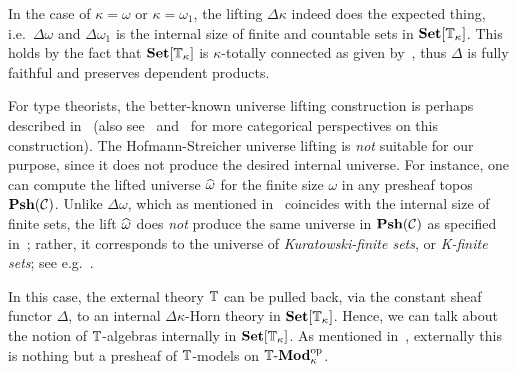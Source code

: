 \begin{remark}\label{rem:constantlifting}
  In the case of $\kappa = \omega$ or $\kappa = \omega_1$, the lifting $\Delta\kappa$ indeed does the expected thing, i.e.\ $\Delta\omega$ and $\Delta\omega_1$ is the internal size of finite and countable sets in $\mathbf{Set}[\mathbb{T}_\kappa]$. This holds by the fact that $\mathbf{Set}[\mathbb{T}_\kappa]$ is $\kappa$-totally connected as given by~, thus $\Delta$ is fully faithful and preserves dependent products.
\end{remark}

\begin{remark}
  For type theorists, the better-known universe lifting construction is perhaps described in~\citet{10.1093/oso/9780198501275.003.0008} (also see~\citet{Awodey_2024} and~\citet{lmcs:17229} for more categorical perspectives on this construction). The Hofmann-Streicher universe lifting is \emph{not} suitable for our purpose, since it does not produce the desired internal universe. For instance, one can compute the lifted universe $\widehat{\omega}$ for the finite size $\omega$ in any presheaf topos $\mathbf{Psh}(\mathcal{C})$. Unlike $\Delta\omega$, which as mentioned in~ coincides with the internal size of finite sets, the lift $\widehat{\omega}$ does \emph{not} produce the same universe in $\mathbf{Psh}(\mathcal{C})$ as specified in~; rather, it corresponds to the universe of \emph{Kuratowski-finite sets}, or \emph{K-finite sets}; see e.g.~\citet[D5.4]{johnstone2002sketches}.
\end{remark}

In this case, the external theory $\mathbb{T}$ can be pulled back, via the constant sheaf functor $\Delta$, to an internal $\Delta\kappa$-Horn theory in $\mathbf{Set}[\mathbb{T}_\kappa]$. Hence, we can talk about the notion of $\mathbb{T}$-algebras internally in $\mathbf{Set}[\mathbb{T}_\kappa]$. As mentioned in~, externally this is nothing but a presheaf of $\mathbb{T}$-models on $\mathbb{T}\text{-}\mathbf{Mod}_\kappa^{\mathrm{op}}$.

